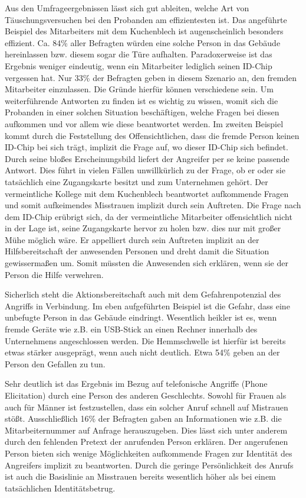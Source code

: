Aus den Umfrageergebnissen lässt sich gut ableiten, welche Art von Täuschungsversuchen bei den Probanden am effizientesten ist.
Das angeführte Beispiel des Mitarbeiters mit dem Kuchenblech ist augenscheinlich besonders effizient.
Ca. 84\% aller Befragten würden eine solche Person in das Gebäude hereinlassen bzw. diesem sogar die Türe aufhalten.
Paradoxerweise ist das Ergebnis weniger eindeutig, wenn ein Mitarbeiter lediglich seinen ID-Chip vergessen hat.
Nur 33\% der Befragten geben in diesem Szenario an, den fremden Mitarbeiter einzulassen.
Die Gründe hierfür können verschiedene sein.
Um weiterführende Antworten zu finden ist es wichtig zu wissen, womit sich die Probanden in einer solchen Situation beschäftigen, welche Fragen bei diesen aufkommen und vor allem wie diese beantwortet werden.
Im zweiten Beispiel kommt durch die Feststellung des Offensichtlichen, dass die fremde Person keinen ID-Chip bei sich trägt, implizit die Frage auf, wo dieser ID-Chip sich befindet.
Durch seine bloßes Erscheinungsbild liefert der Angreifer per se keine passende Antwort.
Dies führt in vielen Fällen unwillkürlich zu der Frage, ob er oder sie tatsächlich eine Zugangskarte besitzt und zum Unternehmen gehört.
Der vermeintliche Kollege mit dem Kuchenblech beantwortet aufkommende Fragen und somit aufkeimendes Misstrauen implizit durch sein Auftreten.
Die Frage nach dem ID-Chip erübrigt sich, da der vermeintliche Mitarbeiter offensichtlich nicht in der Lage ist, seine Zugangskarte hervor zu holen bzw. dies nur mit großer Mühe möglich wäre.
Er appelliert durch sein Auftreten implizit an der Hilfsbereitschaft der anwesenden Personen und dreht damit die Situation gewissermaßen um.
Somit müssten die Anwesenden sich erklären, wenn sie der Person die Hilfe verwehren.

Sicherlich steht die Aktionsbereitschaft auch mit dem Gefahrenpotenzial des Angriffs in Verbindung.
Im eben aufgeführten Beispiel ist die Gefahr, dass eine unbefugte Person in das Gebäude eindringt.
Wesentlich heikler ist es, wenn fremde Geräte wie z.B. ein USB-Stick an einen Rechner innerhalb des Unternehmens angeschlossen werden.
Die Hemmschwelle ist hierfür ist bereits etwas stärker ausgeprägt, wenn auch nicht deutlich.
Etwa 54\% geben an der Person den Gefallen zu tun.

Sehr deutlich ist das Ergebnis im Bezug auf telefonische Angriffe (Phone Elicitation) durch eine Person des anderen Geschlechts.
Sowohl für Frauen als auch für Männer ist festzustellen, dass ein solcher Anruf schnell auf Mistrauen stößt.
Ausschließlich 16\% der Befragten gaben an Informationen wie z.B. die Mitarbeiternummer auf Anfrage herauszugeben.
Dies lässt sich unter anderem durch den fehlenden Pretext der anrufenden Person erklären.
Der angerufenen Person bieten sich wenige Möglichkeiten aufkommende Fragen zur Identität des Angreifers implizit zu beantworten.
Durch die geringe Persönlichkeit des Anrufs ist auch die Basislinie an Misstrauen bereits wesentlich höher als bei einem tatsächlichen Identitätsbetrug.

